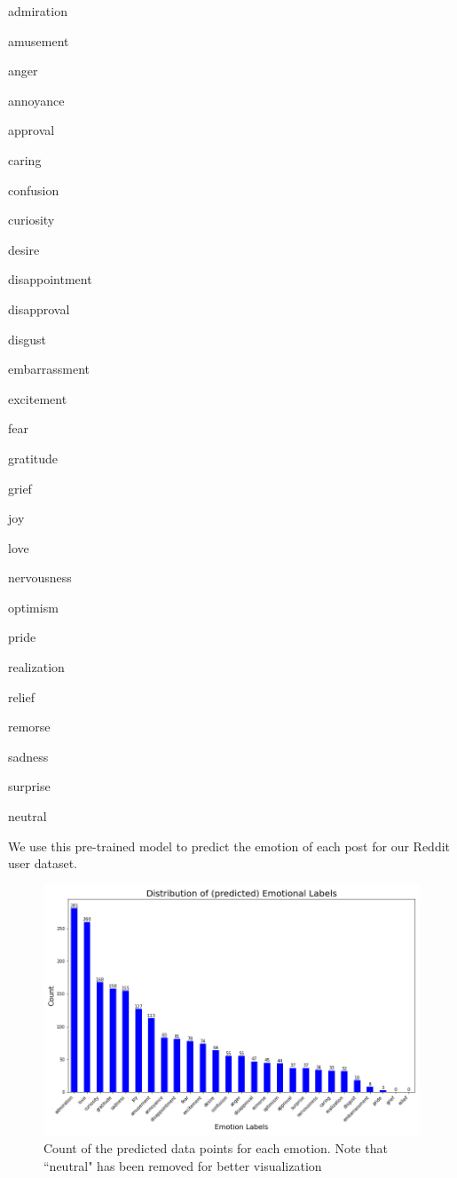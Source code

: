\documentclass[conference,compsoc]{IEEEtran}
\begin{document}
\begin{multiitem}
    \item admiration
    \item amusement
    \item anger
    \item annoyance
    \item approval
    \item caring
    \item confusion
    \item curiosity
    \item desire
    \item disappointment
\end{multiitem}

\begin{multiitem}
    \item disapproval
    \item disgust
    \item embarrassment
    \item excitement
    \item fear
    \item gratitude
    \item grief
    \item joy
    \item love
    \item nervousness
    \item optimism
    \item pride
    \item realization
    \item relief
    \item remorse
    \item sadness
    \item surprise
    \item neutral
\end{multiitem}

We use this pre-trained model to predict the emotion of each post for our Reddit user dataset. 

\begin{figure}[h]
\includegraphics[width=\linewidth]{figs/emotion_distribution.png}
\caption{Count of the predicted data points for each emotion. Note that ``neutral" has been removed for better visualization}
\label{fig:emotionlabel_counts}
\end{figure}
\end{document}
